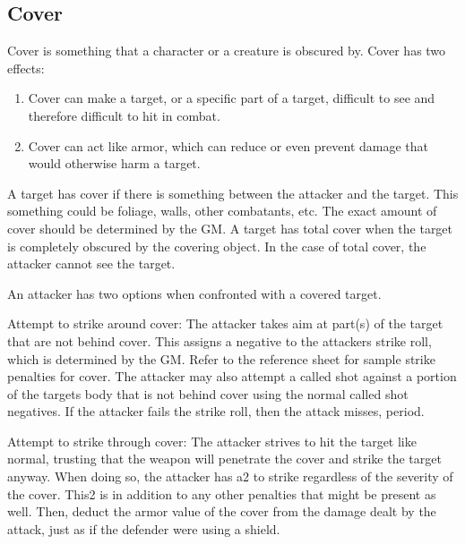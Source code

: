 \documentclass[twoside]{book}
\begin{document}
  
    

\subsection{Cover}
    
    {  
    Cover is something that a character or a creature is obscured by. Cover has two effects:
    }
  
\begin{enumerate}
      
  \item 
    {  
    Cover can make a target, or a specific part of a target, difficult to see and therefore difficult to hit in combat.
    }
  
  \item 
    {  
    Cover can act like armor, which can reduce or even prevent damage that would otherwise harm a target.
    }
  
\end{enumerate}
  
    {  
    A target has cover if there is something between the attacker and the target. This something could be foliage, walls, other combatants, etc. The exact amount of cover should be determined by the GM. A target has total cover when the target is completely obscured by the covering object. In the case of total cover, the attacker cannot see the target.
    }
  
    {  
    An attacker has two options when confronted with a covered target.
    }
  
    {  
    Attempt to strike around cover: The attacker takes aim at part(s) of the target that are not behind cover. This assigns a negative to the attackers strike roll, which is determined by the GM. Refer to the reference sheet for sample strike penalties for cover. The attacker may also attempt a called shot against a portion of the targets body that is not behind cover using the normal called shot negatives. If the attacker fails the strike roll, then the attack misses, period.
    }
  
    {  
    Attempt to strike through cover: The attacker strives to hit the target like normal, trusting that the weapon will penetrate the cover and strike the target anyway. When doing so, the attacker has a2 to strike regardless of the severity of the cover. This2 is in addition to any other penalties that might be present as well. Then, deduct the armor value of the cover from the damage dealt by the attack, just as if the defender were using a shield.
    }
  
\end{document}
